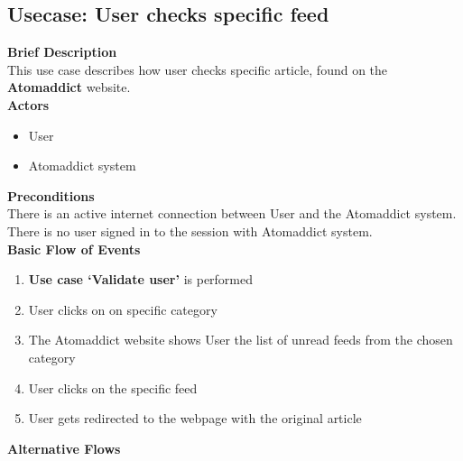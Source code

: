 \documentclass[12pt]{article}
\begin{document}
\vspace{0.5cm}


\subsection{Usecase: User checks specific feed}
\textbf{Brief Description}\\
This use case describes how user checks specific article, found on the \textbf{Atomaddict} website.\\


\textbf{Actors}

\begin{itemize}

    \item User

    \item Atomaddict system

\end{itemize}

\vspace{0.5cm}


\textbf{Preconditions}\\
There is an active internet connection between User and the Atomaddict system. There is no user signed in to the session with Atomaddict system.\\


\textbf{Basic Flow of Events}

\begin{enumerate}

    \item \textbf{Use case `Validate user'} is performed

    \item User clicks on on specific category

    \item The Atomaddict website shows User the list of unread feeds from the chosen category

    \item User clicks on the specific feed

    \item User gets redirected to the webpage with the original article

\end{enumerate}

\vspace{0.5cm}


\textbf{Alternative Flows}
\end{document}
